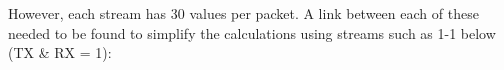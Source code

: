 However, each stream has 30 values per packet. A link between each of these needed to be found to simplify the calculations using streams such as 1-1 below (TX \& RX = 1):
